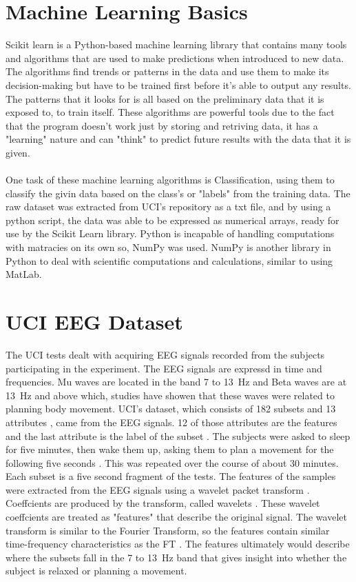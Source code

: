 \documentclass{report}
\begin{document}
\section{Machine Learning Basics}
Scikit learn is a Python-based machine learning library that contains many tools and algorithms that are used to make predictions when introduced to new data. 
The algorithms find trends or patterns in the data and use them to make its decision-making but have to be trained first before it's able to output any results.
The patterns that it looks for is all based on the preliminary data that it is exposed to, to train itself. These algorithms are powerful tools due to the fact that the 
program doesn't work just by storing and retriving data, it has a "learning" nature and can "think" to predict future results with the data that it is given.
\\ \\One task of these machine learning algorithms is Classification, using them to classify the givin data based on the class's or "labels" from the training data. 
The raw dataset was extracted from UCI's repository as a txt file, and by using a python script, the data was able to be expressed as numerical arrays, ready for use 
by the Scikit Learn library. Python is incapable of handling computations with matracies on its own so, NumPy was used. NumPy is another library in Python to 
deal with scientific computations and calculations, similar to using MatLab.

\section{UCI EEG Dataset}
The UCI tests dealt with acquiring EEG signals recorded from the subjects participating in the experiment. The EEG signals are expressd in time and frequencies. 
Mu waves are located in the band 7 to \SI{13}{\hertz} and Beta waves are at \SI{13}{\hertz} and above \cite{classsvm} which, studies have showen that these waves were 
related to planning body movement. UCI's dataset, which consists of 182 subsets and 13 
attributes \cite{classsvm}, came from the EEG signals. 12 of those attributes are the features and the last attribute is the label of the subset \cite{online}. 
The subjects were asked to sleep for five minutes, then 
wake them up, asking them to plan a movement for the following five seconds \cite{classsvm}. This 
was repeated over the course of about 30 minutes. Each subset is a five second fragment of the tests. 
The features of the samples were extracted from the EEG signals using a wavelet packet transform \cite{online}. 
Coeffcients are produced by the transform, called wavelets \cite{wavelet}. These wavelet coeffcients are treated as "features" that describe the original signal.
The wavelet transform is similar to the Fourier Transform, so the features contain similar time-frequency characteristics as the FT \cite{packet}. 
The features ultimately would describe where the subsets fall in the 7 to \SI{13}{\hertz} band that gives insight into whether the subject is relaxed or planning a movement.
\end{document}
